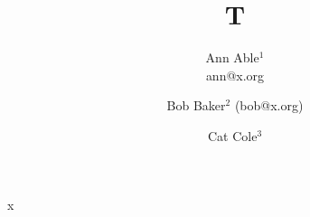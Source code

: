 \documentclass{article}
\begin{document}
\title{T}
\author{Ann Able$^{1}$\\ ann@x.org}
\author{Bob Baker$^{2}$ (bob@x.org)}
\author{Cat Cole$^{3}$ }
\maketitle
x
\end{document}
